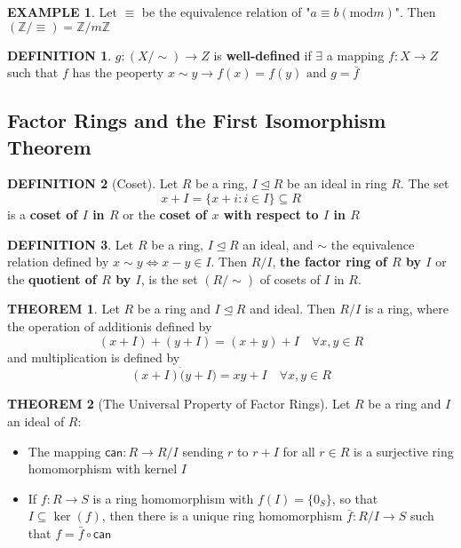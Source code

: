 \documentclass[12pt]{article}
\theoremstyle{definition}
\newtheorem{definition}{DEFINITION}[subsection]
\newtheorem{theorem}{THEOREM}[subsection]
\newtheorem{example}{EXAMPLE}[subsection]
\begin{document}
\begin{example}
    Let $\equiv$ be the equivalence relation of "$a \equiv b (\text{mod}m)$". Then $(\mathbb{Z}/\equiv) = \mathbb{Z}/m\mathbb{Z}$
\end{example}

\begin{definition}
    $g:(X/\sim) \rightarrow Z$ is \textbf{well-defined} if $\exists$ a mapping $f:X \rightarrow Z$ such that $f$ has the peoperty $x \sim y \rightarrow f(x) = f(y) \text{ and } g = \bar{f}$ 
\end{definition}


\subsection{Factor Rings and the First Isomorphism Theorem}
\begin{definition}[Coset]
    Let $R$ be a ring, $I \trianglelefteq R$ be an ideal in ring $R$. The set $$x + I = \{x+i:i\in I\}\subseteq R$$ is a \textbf{coset of $I$ in $R$} or the \textbf{coset of $x$ with respect to $I$ in $R$}
\end{definition}

\begin{definition}
    Let $R$ be a ring, $I \trianglelefteq R$ an ideal, and $\sim$ the equivalence relation defined by $x \sim y \Leftrightarrow x - y \in I$. Then $R/I$, \textbf{the factor ring of $R$ by $I$} or the \textbf{quotient of $R$ by $I$}, is the set $(R/ \sim)$ of cosets of $I$ in $R$.
\end{definition}

\begin{theorem}
    Let $R$ be a ring and $I \trianglelefteq R$ and ideal. Then $R/I$ is a ring, where the operation of additionis defined by
    $$(x+I)+(y+I) = (x+y) + I \quad \forall x, y \in R$$
    and multiplication is defined by
    $$(x + I)\dot(y+I) = xy + I \quad \forall x,y \in R$$
\end{theorem}

\begin{theorem}[The Universal Property of Factor Rings]
    Let $R$ be a ring and $I$ an ideal of $R$:
    \begin{itemize}
        \item The mapping $\mathsf{can}: R \rightarrow R/I$ sending $r$ to $r+I$ for all $r \in R$ is a surjective ring homomorphism with kernel $I$
        \item If $f:R \rightarrow S$ is a ring homomorphism with $f(I) = \{0_S\}$, so that $I \subseteq \ker(f)$, then there is a unique ring homomorphism $\bar{f}:R/I \rightarrow S$ such that $f = \bar{f} \circ \mathsf{can}$
    \end{itemize}
\end{theorem}
\end{document}
